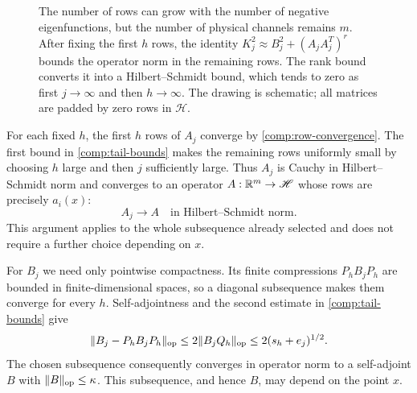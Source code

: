 \begin{figure}[tb]
 \centering
 \caption{The number of rows can grow with the number of negative
 eigenfunctions, but the number of physical channels remains $m$.
 After fixing the first $h$ rows, the identity
 $K_j^2\approx B_j^2+(A_jA_j^T)^r$ bounds the operator norm in the
 remaining rows.  The rank bound converts it into a Hilbert--Schmidt
 bound, which tends to zero as first $j\to\infty$ and then $h\to\infty$.
 The drawing is schematic; all matrices are padded by zero rows in
 $\mathscr H$.}
 \label{comp:tail-figure}
\end{figure}

For each fixed $h$, the first $h$ rows of $A_j$ converge by
\eqref{comp:row-convergence}.  The first bound in
\eqref{comp:tail-bounds} makes the remaining rows uniformly small by
choosing $h$ large and then $j$ sufficiently large.  Thus $A_j$ is Cauchy in
Hilbert--Schmidt norm and converges to an operator $A:\mathbb R^m\to\mathscr H$
whose rows are precisely $a_i(x)$:
\begin{equation}
 A_j\longrightarrow A\quad\text{in Hilbert--Schmidt norm.}
 \label{comp:HS-limit}
\end{equation}
This argument applies to the whole subsequence already selected and
does not require a further choice depending on $x$.

For $B_j$ we need only pointwise compactness.  Its finite compressions
$P_hB_jP_h$ are bounded in finite-dimensional spaces, so a diagonal
subsequence makes them converge for every $h$.  Self-adjointness and
the second estimate in \eqref{comp:tail-bounds} give
\[
 \|B_j-P_hB_jP_h\|_{\operatorname{op}}
   \leq2\|B_jQ_h\|_{\operatorname{op}}
   \leq2(s_h+e_j)^{1/2}.
\]
The chosen subsequence consequently converges in operator norm to a
self-adjoint $B$ with $\|B\|_{\operatorname{op}}\leq\kappa$.  This subsequence, and
hence $B$, may depend on the point $x$.

